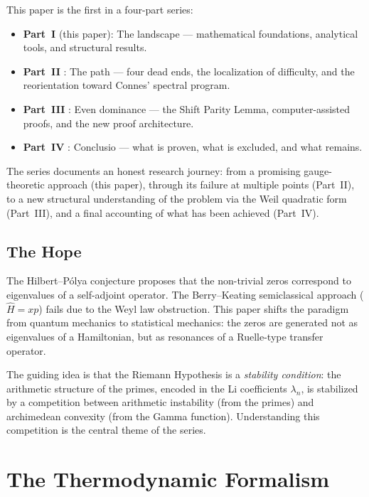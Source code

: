 \documentclass[12pt,a4paper]{article}
\theoremstyle{definition}
\theoremstyle{remark}
\begin{document}
This paper is the first in a four-part series:
\begin{itemize}
  \item \textbf{Part~I} (this paper): The landscape --- mathematical foundations, analytical tools, and structural results.
  \item \textbf{Part~II} \cite{Geiger2026partII}: The path --- four dead ends, the localization of difficulty, and the reorientation toward Connes' spectral program.
  \item \textbf{Part~III} \cite{Geiger2026partIII}: Even dominance --- the Shift Parity Lemma, computer-assisted proofs, and the new proof architecture.
  \item \textbf{Part~IV} \cite{Geiger2026partIV}: Conclusio --- what is proven, what is excluded, and what remains.
\end{itemize}

The series documents an honest research journey: from a promising gauge-theoretic approach (this paper), through its failure at multiple points (Part~II), to a new structural understanding of the problem via the Weil quadratic form (Part~III), and a final accounting of what has been achieved (Part~IV).

\subsection{The Hope}

The Hilbert--P\'olya conjecture proposes that the non-trivial zeros correspond to eigenvalues of a self-adjoint operator. The Berry--Keating semiclassical approach ($\hat{H} = xp$) fails due to the Weyl law obstruction. This paper shifts the paradigm from quantum mechanics to statistical mechanics: the zeros are generated not as eigenvalues of a Hamiltonian, but as resonances of a Ruelle-type transfer operator.

The guiding idea is that the Riemann Hypothesis is a \emph{stability condition}: the arithmetic structure of the primes, encoded in the Li coefficients $\lambda_n$, is stabilized by a competition between arithmetic instability (from the primes) and archimedean convexity (from the Gamma function). Understanding this competition is the central theme of the series.


\section{The Thermodynamic Formalism}
\label{sec:thermodynamic}
\end{document}
